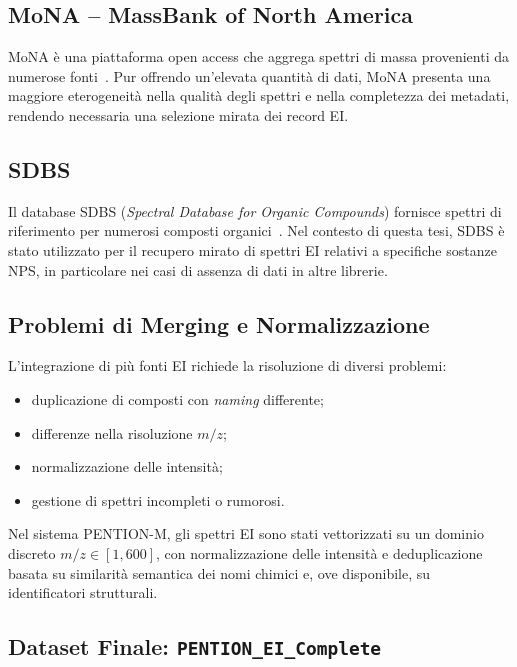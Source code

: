 \subsection{MoNA -- MassBank of North America}
\label{subsec:mona}

MoNA è una piattaforma open access che aggrega spettri di massa provenienti da numerose fonti~\cite{mona}.
Pur offrendo un’elevata quantità di dati, MoNA presenta una maggiore eterogeneità nella qualità degli spettri e nella completezza dei metadati, rendendo necessaria una selezione mirata dei record EI.

\subsection{SDBS}
\label{subsec:sdbs}

Il database SDBS (\emph{Spectral Database for Organic Compounds}) fornisce spettri di riferimento per numerosi composti organici~\cite{sdbs}.
Nel contesto di questa tesi, SDBS è stato utilizzato per il recupero mirato di spettri EI relativi a specifiche sostanze NPS, in particolare nei casi di assenza di dati in altre librerie.

\subsection{Problemi di Merging e Normalizzazione}
\label{subsec:merging}

L’integrazione di più fonti EI richiede la risoluzione di diversi problemi:
\begin{itemize}
    \item duplicazione di composti con \textit{naming} differente;
    \item differenze nella risoluzione $m/z$;
    \item normalizzazione delle intensità;
    \item gestione di spettri incompleti o rumorosi.
\end{itemize}

Nel sistema PENTION-M, gli spettri EI sono stati vettorizzati su un dominio discreto $m/z \in [1,600]$, con normalizzazione delle intensità e deduplicazione basata su similarità semantica dei nomi chimici e, ove disponibile, su identificatori strutturali.

\subsection{Dataset Finale: \texttt{PENTION\_EI\_Complete}}
\label{subsec:pention_dataset}

